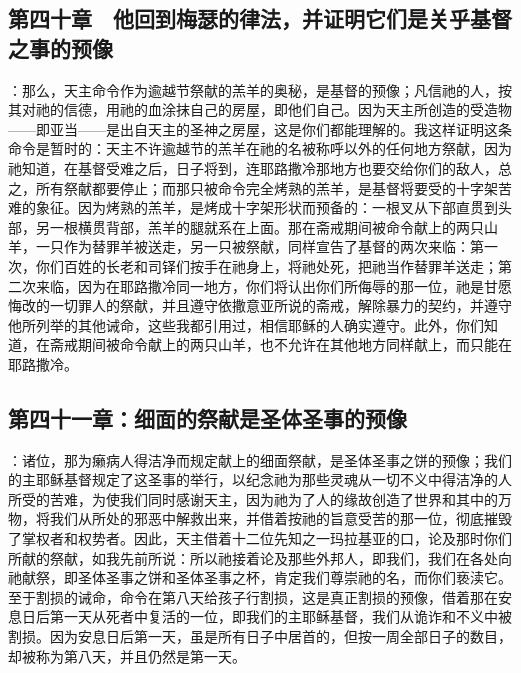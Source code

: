 \subsection{第四十章　他回到梅瑟的律法，并证明它们是关乎基督之事的预像}

：那么，天主命令作为逾越节祭献的羔羊的奥秘，是基督的预像；凡信祂的人，按其对祂的信德，用祂的血涂抹自己的房屋，即他们自己。因为天主所创造的受造物——即亚当——是出自天主的圣神之房屋，这是你们都能理解的。我这样证明这条命令是暂时的：天主不许逾越节的羔羊在祂的名被称呼以外的任何地方祭献，因为祂知道，在基督受难之后，日子将到，连耶路撒冷那地方也要交给你们的敌人，总之，所有祭献都要停止；而那只被命令完全烤熟的羔羊，是基督将要受的十字架苦难的象征。因为烤熟的羔羊，是烤成十字架形状而预备的：一根叉从下部直贯到头部，另一根横贯背部，羔羊的腿就系在上面。那在斋戒期间被命令献上的两只山羊，一只作为替罪羊被送走，另一只被祭献，同样宣告了基督的两次来临：第一次，你们百姓的长老和司铎们按手在祂身上，将祂处死，把祂当作替罪羊送走；第二次来临，因为在耶路撒冷同一地方，你们将认出你们所侮辱的那一位，祂是甘愿悔改的一切罪人的祭献，并且遵守依撒意亚所说的斋戒，解除暴力的契约，并遵守他所列举的其他诫命，这些我都引用过，相信耶稣的人确实遵守。此外，你们知道，在斋戒期间被命令献上的两只山羊，也不允许在其他地方同样献上，而只能在耶路撒冷。\par


\subsection{第四十一章：细面的祭献是圣体圣事的预像}

：诸位，那为癞病人得洁净而规定献上的细面祭献，是圣体圣事之饼的预像；我们的主耶稣基督规定了这圣事的举行，以纪念祂为那些灵魂从一切不义中得洁净的人所受的苦难，为使我们同时感谢天主，因为祂为了人的缘故创造了世界和其中的万物，将我们从所处的邪恶中解救出来，并借着按祂的旨意受苦的那一位，彻底摧毁了掌权者和权势者。因此，天主借着十二位先知之一玛拉基亚的口，论及那时你们所献的祭献，如我先前所说：所以祂接着论及那些外邦人，即我们，我们在各处向祂献祭，即圣体圣事之饼和圣体圣事之杯，肯定我们尊崇祂的名，而你们亵渎它。至于割损的诫命，命令在第八天给孩子行割损，这是真正割损的预像，借着那在安息日后第一天从死者中复活的一位，即我们的主耶稣基督，我们从诡诈和不义中被割损。因为安息日后第一天，虽是所有日子中居首的，但按一周全部日子的数目，却被称为第八天，并且仍然是第一天。\par

